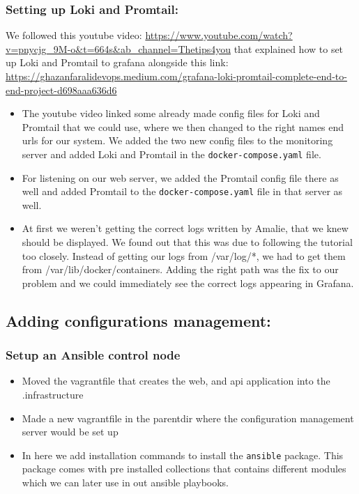 \subsubsection{Setting up Loki and Promtail:}
\label{log:setting-up-loki-and-promtail}

We followed this youtube video: \url{https://www.youtube.com/watch?v=pnycjg_9M-o\&t=664s\&ab_channel=Thetips4you} that explained how to set up Loki and Promtail to grafana alongside this link: \url{https://ghazanfaralidevops.medium.com/grafana-loki-promtail-complete-end-to-end-project-d698aaa636d6}

\begin{itemize}
    \item The youtube video linked some already made config files for Loki and Promtail that we could use, where we then changed to the right names end urls for our system. We added the two new config files to the monitoring server and added Loki and Promtail in the \texttt{docker-compose.yaml} file.
    \item For listening on our web server, we added the Promtail config file there as well and added Promtail to the \texttt{docker-compose.yaml} file in that server as well.
    \item At first we weren't getting the correct logs written by Amalie, that we knew should be displayed. We found out that this was due to following the tutorial too closely. Instead of getting our logs from /var/log/*, we had to get them from /var/lib/docker/containers. Adding the right path was the fix to our problem and we could immediately see the correct logs appearing in Grafana.
\end{itemize}

\subsection{Adding configurations management:}
\label{log:adding-configurations-management}

\subsubsection{Setup an Ansible control node}
\label{log:setup-an-ansible-control-node}

\begin{itemize}
    \item Moved the vagrantfile that creates the web, and api application into the .infrastructure
    \item Made a new vagrantfile in the parentdir where the configuration management server would be set up
    \item In here we add installation commands to install the \texttt{ansible} package. This package comes with pre installed collections that contains different modules which we can later use in out ansible playbooks.
\end{itemize}

